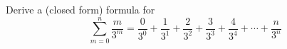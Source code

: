 Derive a (closed form) formula for 
\[
\sum_{m=0}^n \frac{m}{3^m} = \frac{0}{3^0} + \frac{1}{3^1} + \frac{2}{3^2} + \frac{3}{3^3} + \frac{4}{3^4} + \cdots + \frac{n}{3^n}
\]
